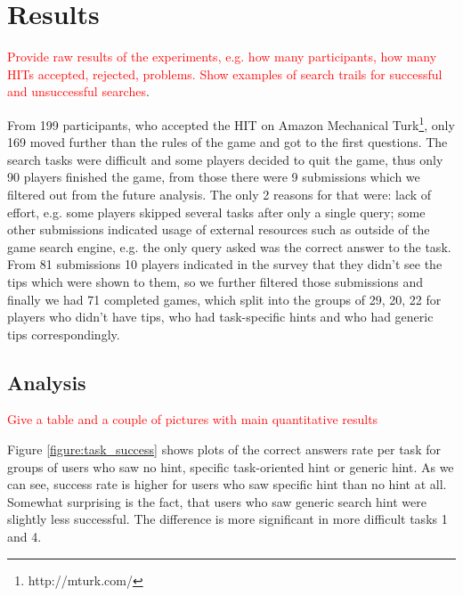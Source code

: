 \documentclass{sig-alternate}
\newcommand\todo[1]{\textcolor{red}{#1}}
\begin{document}
\section{Results}
\todo{Provide raw results of the experiments, e.g. how many participants, how many HITs accepted, rejected, problems. Show examples of search trails for successful and unsuccessful searches}.

From 199 participants, who accepted the HIT on Amazon Mechanical Turk\footnote{http://mturk.com/}, only 169 moved further than the rules of the game and got to the first questions.
The search tasks were difficult and some players decided to quit the game, thus only 90 players finished the game, from those there were 9 submissions which we filtered out from the future analysis.
The only 2 reasons for that were: lack of effort, e.g. some players skipped several tasks after only a single query; some other submissions indicated usage of external resources such as outside of the game search engine, e.g. the only query asked was the correct answer to the task.
From 81 submissions 10 players indicated in the survey that they didn't see the tips which were shown to them, so we further filtered those submissions and finally we had 71 completed games, which split into the groups of 29, 20, 22 for players who didn't have tips, who had task-specific hints and who had generic tips correspondingly.


\subsection{Analysis}
\todo{Give a table and a couple of pictures with main quantitative results}

Figure \ref{figure:task_success} shows plots of the correct answers rate per task for groups of users who saw no hint, specific task-oriented hint or generic hint. As we can see, success rate is higher for users who saw specific hint than no hint at all. Somewhat surprising is the fact, that users who saw generic search hint were slightly less successful. The difference is more significant in more difficult tasks 1 and 4.
\end{document}
